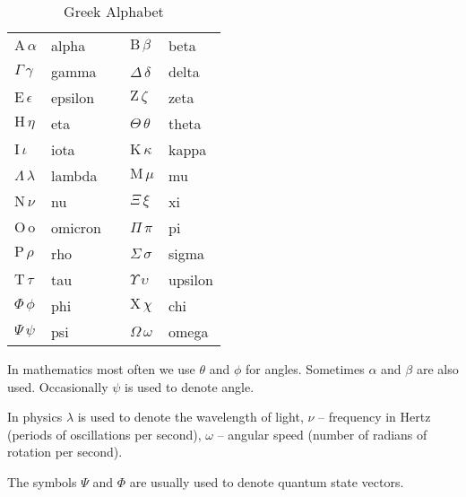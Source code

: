 \begin{table}[h]
  \begin{tabular}{l l c l l}
    \toprule
    $\mathrm{A}\, \alpha$ & alpha & & $\mathrm{B}\, \beta$ & beta\\
    $\Gamma\, \gamma$ & gamma & & $\Delta\, \delta$ & delta\\
    $\mathrm{E}\, \epsilon$ & epsilon & & $\mathrm{Z}\, \zeta$ & zeta\\
    $\mathrm{H}\, \eta$ & eta & & $\Theta\, \theta$ & theta\\
    $\mathrm{I}\, \iota$ & iota & & $\mathrm{K}\, \kappa$ & kappa\\
    $\Lambda\, \lambda$ & lambda & & $\mathrm{M}\, \mu$ & mu\\
    $\mathrm{N}\, \nu$ & nu & & $\Xi\, \xi$ & xi\\
    $\mathrm{O}\, \mathrm{o}$ & omicron & & $\Pi\, \pi$ & pi\\
    $\mathrm{P}\, \rho$ & rho & & $\Sigma\, \sigma$ & sigma\\
    $\mathrm{T}\, \tau$ & tau & & $\Upsilon\, \upsilon$ & upsilon\\
    $\Phi\, \phi$ & phi & & $\mathrm{X}\, \chi$ & chi\\
    $\Psi\, \psi$ & psi & & $\Omega\, \omega$ & omega\\
    \bottomrule
  \end{tabular}
  \caption{Greek Alphabet}
\end{table}

In mathematics most often we use $\theta$ and $\phi$ for
angles. Sometimes $\alpha$ and $\beta$ are also used. Occasionally
$\psi$ is used to denote angle.

In physics $\lambda$ is used to denote the wavelength of light, $\nu$
-- frequency in Hertz (periods of oscillations per second), $\omega$
-- angular speed (number of radians of rotation per second).

The symbols $\Psi$ and $\Phi$ are usually used to denote quantum state vectors.

